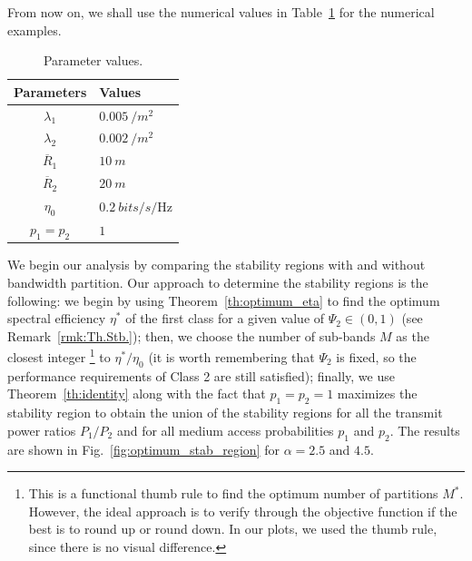 From now on, we shall use the numerical values in Table~\ref{tab:user_classes} for the numerical examples.
%
\begin{table}[!ht]
    \centering
        \caption{Parameter values.}
    \begin{tabular}{ c|l }
    \hline
    Parameters & Values \\
    \hline\hline
     $\lambda_1$        & $\SI{0.005}{/m^2}$      \\
     $\lambda_2$        & $\SI{0.002}{/m^2}$      \\
     $\overline{R}_1$   & $\SI{10}{m}$            \\
     $\overline{R}_2$   & $\SI{20}{m}$           \\
     $\eta_0$           & $\SI{0.2}{bits/s/\hertz}$   \\
     $p_1=p_2$          & $1$   \\
    \hline
    \end{tabular}
    \label{tab:user_classes}
\end{table}
%
We begin our analysis by comparing the stability regions with and without bandwidth partition. 
%
Our approach to determine the stability regions is the following: we begin by using  Theorem~\ref{th:optimum_eta} to find the optimum spectral efficiency $\eta^*$ of the first class for a given value of ${\Psi_2\in(0,1)}$ (see Remark~\ref{rmk:Th.Stb.}); then, we choose the number of sub-bands $M$ as the closest integer%
\footnote{This is a functional thumb rule to find the optimum number of partitions $M^*$. However, the ideal approach is to verify through the objective function if the best is to round up or round down.
In our plots, we used the thumb rule, since there is no visual difference.}
to $\eta^*/\eta_0$ (it is worth remembering that $\Psi_2$ is fixed, so the performance requirements of Class 2 are still satisfied); finally, we use Theorem~\ref{th:identity} along with the fact that $p_1=p_2=1$ maximizes the stability region to obtain the union of the stability regions for all the transmit power ratios $P_1/P_2$ and for all medium access probabilities $p_1$ and $p_2$. The results are shown in Fig.~\ref{fig:optimum_stab_region} for $\alpha = 2.5$ and $4.5$.
%
